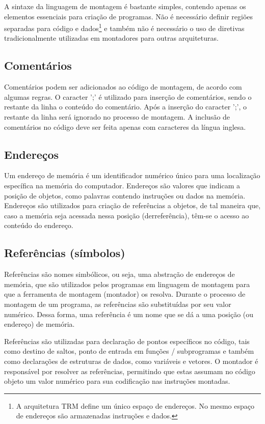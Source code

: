\documentclass[11pt,a4paper]{report}
\begin{document}
A sintaxe da linguagem de montagem é bastante simples, contendo apenas
os elementos essenciais para criação de programas. Não é necessário
definir regiões separadas para código e dados\footnote{A arquitetura TRM
define um único espaço de endereços. No mesmo espaço de endereços
são armazenadas instruções e dados.} e também não é necessário o uso 
de diretivas tradicionalmente utilizadas em montadores para outras
arquiteturas.

\subsection{Comentários}

Comentários podem ser adicionados ao código de montagem, de acordo com
algumas regras. O caracter ';' é utilizado para inserção de comentários,
sendo o restante da linha o conteúdo do comentário. Após a inserção do
caracter ';', o restante da linha será ignorado no processo de montagem.
A inclusão de comentários no código deve ser feita apenas com caracteres
da língua inglesa.

\subsection{Endereços}

Um endereço de memória é um identificador numérico único para uma
localização específica na memória do computador. Endereços são valores
que indicam a posição de objetos, como palavras contendo instruções ou
dados na memória. Endereços são utilizados para criação de referências a
objetos, de tal maneira que, caso a memória seja acessada nessa posição
(derreferência), têm-se o acesso ao conteúdo do endereço. 

\subsection{Referências (símbolos)}

Referências são nomes simbólicos, ou seja, uma abstração de endereços
de memória, que são utilizados pelos programas em linguagem de montagem
para que a ferramenta de montagem (montador) os resolva. Durante o
processo de montagem de um programa, as referências são substituídas por
seu valor numérico. Dessa forma, uma referência é um nome que se dá a
uma posição (ou endereço) de memória.

Referências são utilizadas para declaração de pontos específicos no código,
tais como destino de saltos, ponto de entrada em funções / subprogramas
e também como declarações de estruturas de dados, como variáveis e
vetores. O montador é responsável por resolver as referências,
permitindo que estas assumam no código objeto um valor numérico para
sua codificação nas instruções montadas.
\end{document}
